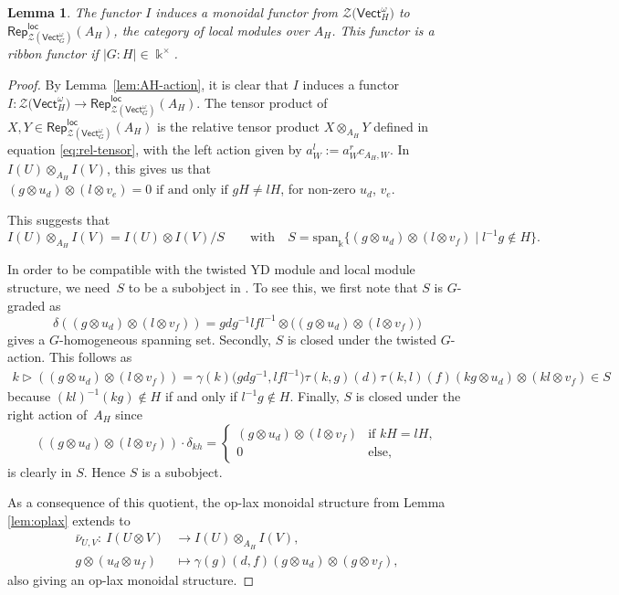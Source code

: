 \documentclass[pdftex]{sigma}
\numberwithin{equation}{section}
\newtheorem{Lemma}[Theorem]{Lemma}
\newcommand{\locmod}{\mathsf{Rep}^{\mathsf{loc}}}
\newcommand{\Vect}{\mathsf{Vect}}
\newcommand{\cZ}{\mathcal{Z}}
\newcommand{\rI}{I}
\begin{document}
\begin{Lemma}\label{lem:Imonoidal}
The functor $\rI$ induces a monoidal functor
from $\cZ\big(\Vect_H^\omega\big)$ to $\locmod_{\cZ(\Vect_G^\omega)}(A_H)$, the category of local modules over $A_H$. This functor is a ribbon functor if $|G:H|\in \Bbbk^\times$.
\end{Lemma}
\begin{proof}
By Lemma~\ref{lem:AH-action}, it is clear that $\rI$ induces a functor $\rI \colon \cZ\big(\Vect_H^\omega\big) \to \locmod_{\cZ(\Vect_G^\omega)}(A_H)$.
The tensor product of $X,Y \in \locmod_{\cZ(\Vect_G^\omega)}(A_H)$ is the relative tensor product $X\otimes_{A_H} Y$ defined in equation \eqref{eq:rel-tensor}, with the left action given by $a_W^l := a^r_W c_{A_H,W}$.
In $\rI(U) \otimes_{A_H} \rI(V)$, this gives us that $(g \otimes u_d) \otimes (l \otimes v_e) = 0 \text{ if and only if } gH \neq lH$, for non-zero $u_d$, $v_e$.

This suggests that \[\rI(U) \otimes_{A_H} \rI(V) = \rI(U) \otimes \rI(V)/S \qquad\text{with}\quad S = \mathrm{span}_\Bbbk\{(g\otimes u_d) \otimes (l\otimes v_f) \mid l^{-1}g \notin H\}.\]

In order to be compatible with the twisted YD module and local module structure, we need~$S$ to be a subobject in \smash{$\locmod_{\cZ(\Vect_G^\omega)}(A_H)$}.
To see this, we first note that $S$ is $G$-graded as \[\delta((g\otimes u_d) \otimes (l\otimes v_f)) = gdg^{-1}lfl^{-1} \otimes \big( (g\otimes u_d) \otimes (l\otimes v_f) \big)\] gives a $G$-homogeneous spanning set. Secondly, $S$ is closed under the twisted $G$-action. This follows as
\begin{gather*}
k \vartriangleright ((g\otimes u_d) \otimes (l\otimes v_f)) = \gamma(k)\big(gdg^{-1},lfl^{-1}\big)\tau(k,g)(d)\tau(k,l)(f)(kg\otimes u_d) \otimes (kl\otimes v_f) \!\in \! S
\end{gather*}
because $(kl)^{-1}(kg) \notin H$ if and only if $l^{-1}g\notin H$.
Finally, $S$ is closed under the right action of~$A_H$ since
\[((g\otimes u_d) \otimes (l\otimes v_f) ) \cdot \delta_{kh} =
\begin{cases}
(g\otimes u_d) \otimes (l\otimes v_f) & \text{if }kH = lH,\\
0 & \text{else},
\end{cases}
\]
is clearly in $S$. Hence $S$ is a subobject.

As a consequence of this quotient, the op-lax monoidal structure from Lemma \ref{lem:oplax} extends to
\begin{align*}
 \bar{\nu}_{U,V}\colon\ \rI(U\otimes V) &\longrightarrow \rI(U) \otimes_{A_H} \rI(V), \\
 g \otimes (u_d \otimes u_f) &\mapsto \gamma(g)(d,f) (g \otimes u_d) \otimes (g \otimes v_f),
\end{align*}
also giving an op-lax monoidal structure.


\end{proof}
\end{document}
